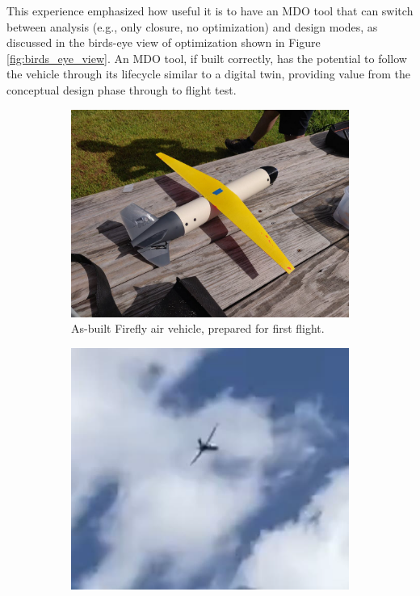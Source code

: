 This experience emphasized how useful it is to have an MDO tool that can switch between analysis (e.g., only closure, no optimization) and design modes, as discussed in the birds-eye view of optimization shown in Figure \ref{fig:birds_eye_view}. An MDO tool, if built correctly, has the potential to follow the vehicle through its lifecycle similar to a digital twin, providing value from the conceptual design phase through to flight test.

\begin{figure}[h]
    \centering
    \begin{subfigure}[b]{0.5\textwidth}
        \centering
        \includegraphics[width=\textwidth]{../figures/firefly_flight_1.png}
        \caption{As-built Firefly air vehicle, prepared for first flight.}
    \end{subfigure}
    \hfill
    \begin{subfigure}[b]{0.432\textwidth}
        \centering
        \includegraphics[width=\textwidth]{../figures/firefly_flight_2.png}

\end{subfigure}
\end{figure}
